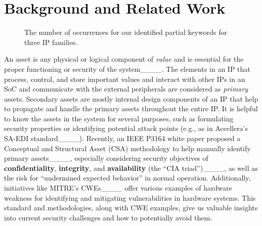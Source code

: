 \section{Background and Related Work\label{sec:background}
}

\begin{figure*}[t]
\centering
{}\hfill
{}\hfill
{}
\caption{The number of occurrences for our identified partial keywords for three IP families.\label{fig:explanations_of_general_image}
}
\end{figure*}


An asset is any physical or logical component of \textit{value} and is essential for the proper functioning or security of the system____.
The elements in an \ac{IP} that process, control, and store important values and interact with other \acp{IP} in an \ac{SoC} and communicate with the external peripherals are considered as \textit{primary} assets. 
Secondary assets are mostly internal design components of an \ac{IP} that help to propagate and handle the primary assets throughout the entire \ac{IP}.
It is helpful to know the assets in the system for several purposes, such as formulating security properties or identifying potential attack points (e.g., as in Accellera's \ac{SA-EDI} standard____). 
Recently, an IEEE P3164 white paper proposed a Conceptual and Structural Asset (CSA) methodology to help manually identify primary assets____, especially considering security objectives of \textbf{confidentiality}, \textbf{integrity}, and \textbf{availability} (the ``CIA triad'')____, as well as the risk for ``undermined expected behavior'' in normal operation. 
Additionally, initiatives like MITRE's \acp{CWE}____ offer various examples of hardware weakness for identifying and mitigating vulnerabilities in hardware systems. 
This standard and methodologies, along with \ac{CWE} examples, give us valuable insights into current security challenges and how to potentially avoid them. 

